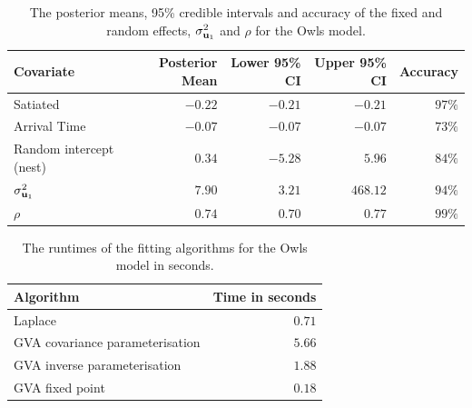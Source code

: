 \begin{table}
	\begin{tabular}{|l|rrrr|}
		\hline
		Covariate          & Posterior Mean & Lower 95\% CI & Upper 95\% CI & Accuracy \\
		\hline
		Satiated & $-0.22$ & $-0.21$ & $-0.21$ & $97\%$ \\
		Arrival Time & $-0.07$ & $-0.07$ & $-0.07$ & $73\%$ \\
		Random intercept (nest) & $0.34$ & $-5.28$ & $5.96$ & $84\%$ \\
		$\sigma_{{\bf u}_1}^2$ & $7.90$ & $3.21$ & $468.12$ & $94\%$ \\
		$\rho$ & $0.74$ & $0.70$ & $0.77$ & $99\%$ \\
		\hline
	\end{tabular}			
	\label{tab:owls_results}
	\caption{The posterior means, 95\% credible intervals and accuracy of the fixed and random
						effects, $\sigma_{{\bf u}_1}^2$ and $\rho$ for the Owls model.}
\end{table}

\begin{table}
	\begin{tabular}{|l|r|}
	\hline
	Algorithm & Time in seconds \\
	\hline
	Laplace & $0.71$ \\
	GVA covariance parameterisation & $5.66$ \\
	GVA inverse parameterisation & $1.88$ \\
	GVA fixed point & $0.18$ \\
	\hline
	\end{tabular}
	\caption{The runtimes of the fitting algorithms for the Owls model in seconds.}
	\label{tab:owls_times}
\end{table}

